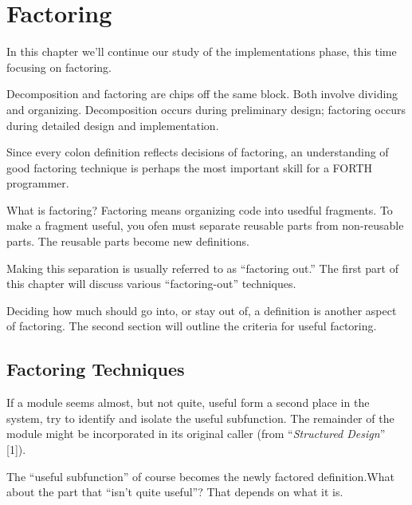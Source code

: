 




\chapter{Factoring}

In this chapter we'll continue our study of the implementations phase, this time focusing on factoring.

Decomposition and factoring are chips off the same block. Both involve dividing and organizing. Decomposition occurs during preliminary design; factoring occurs during detailed design and implementation.

Since every colon definition reflects decisions of factoring, an understanding of good factoring technique is perhaps the most important skill for a FORTH programmer.

What is factoring? Factoring means organizing code into usedful fragments. To make a fragment useful, you ofen must separate reusable parts from non-reusable parts. The reusable parts become new definitions.

Making this separation is usually referred to as ``factoring out.'' The first part of this chapter will discuss various ``factoring-out'' techniques.

Deciding how much should go into, or stay out of, a definition is another aspect of factoring. The second section will outline the criteria for useful factoring.

\section{Factoring Techniques}

\begin{tfquot}
If a module seems almost, but not quite, useful form a second place in the system, try to identify and isolate the useful subfunction. The remainder of the module might be incorporated in its original caller (from ``\textit{Structured Design}'' [1]).
\end{tfquot}
The ``useful subfunction'' of course becomes the newly factored definition.What about the part that ``isn't quite useful''? That depends on what it is.

